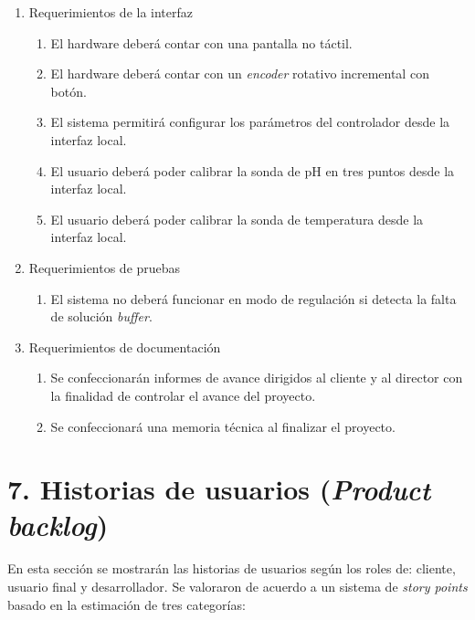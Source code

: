 \documentclass[
11pt, %
codirector, %
]{charter}
\begin{document}
\begin{enumerate}
	\item Requerimientos de la interfaz
		\begin{enumerate}
			\item El hardware deberá contar con una pantalla no táctil.
			\item El hardware deberá contar con un \textit{encoder} rotativo incremental con botón.
			\item El sistema permitirá configurar los parámetros del controlador desde la interfaz local.
			\item El usuario deberá poder calibrar la sonda de pH en tres puntos desde la interfaz local.
			\item El usuario deberá poder calibrar la sonda de temperatura desde la interfaz local.
		\end{enumerate}
		
	\item Requerimientos de pruebas
		\begin{enumerate}
			\item El sistema no deberá funcionar en modo de regulación si detecta la falta de solución \textit{buffer}.
		\end{enumerate}
		
	\item Requerimientos de documentación
		\begin{enumerate}
			\item Se confeccionarán informes de avance dirigidos al cliente y al director con la finalidad de controlar el avance del proyecto.
			\item Se confeccionará una memoria técnica al finalizar el proyecto.
		\end{enumerate}
\end{enumerate}

\section{7. Historias de usuarios (\textit{Product backlog})}
\label{sec:backlog}

En esta sección se mostrarán las historias de usuarios según los roles de: cliente, usuario final y desarrollador. Se valoraron de acuerdo a un sistema de \textit{story points} basado en la estimación de tres categorías:
\end{document}
